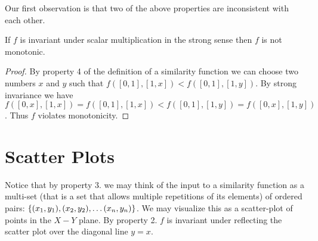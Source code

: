 \documentclass{article}
\begin{document}
Our first observation is that two of the above properties are inconsistent with
each other.

\begin{proposition}
If $f$ is invariant under scalar multiplication in the strong sense then $f$ is
not monotonic.
\end{proposition}
\begin{proof}
By property 4 of the definition of a similarity function we can choose two
numbers $x$ and $y$ such that
$f([0,1],[1,x])<f([0,1],[1,y])$. By strong invariance we have
$f([0,x],[1,x])=f([0,1],[1,x])<f([0,1],[1,y])=f([0,x],[1,y])$. Thus $f$ violates monotonicity.
\end{proof}

\section{Scatter Plots}
Notice that by property 3. we may think of the input to a similarity function
as a multi-set (that is a set that allows multiple repetitions of its elements)
of ordered pairs: $\left\{(x_1,y_1),(x_2,y_2),\dots (x_n,y_n)\right\}$. We may
visualize this as a scatter-plot of points in the $X-Y$ plane. By property 2.
$f$ is invariant under reflecting the scatter plot over the diagonal line $y=x$.
\end{document}
